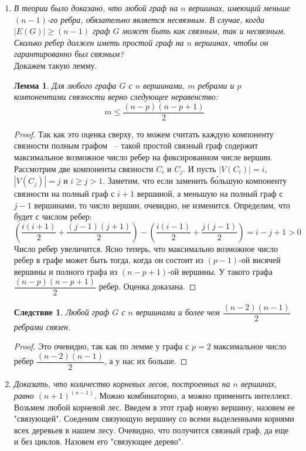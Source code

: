 \documentclass[10pt,a4paper]{article}
\begin{document}
\begin{enumerate}
	\item \textit{В теории было доказано, что любой граф на $n$ вершинах, имеющий меньше $(n-1)$-го ребра, обязательно является несвязным. В случае, когда $|E(G)|\geqslant(n-1)$ граф $G$ может быть как связным, так и несвязным. Сколько ребер должен иметь простой граф на $n$ вершинах, чтобы он гарантированно был связным?}\\
	Докажем такую лемму.
	\newtheorem*{lemma1}{Лемма}
	\begin{lemma1}
	Для любого графа $G$ с $n$ вершинами, $m$ ребрами и $p$ компонентами связности верно следующее неравенство:
	\[
	m \leqslant \dfrac{(n-p)(n-p+1)}{2}
	\]
	\end{lemma1}
	\begin{proof}
	Так как это оценка сверху, то можем считать каждую компоненту связности полным графом ~-- такой простой связный граф содержит максимальное возможное число ребер на фиксированном числе вершин.\\
	Рассмотрим две компоненты связности $C_i$ и $C_j$. И пусть $|V(C_i)|=i$, $|V(C_j)|=j$ и $i \geqslant j > 1$. Заметим, что если заменить б\'{о}льшую компоненту связности на полный граф с $i+1$ вершиной, а меньшую на полный граф с $j-1$ вершинами, то число вершин, очевидно, не изменится. Определим, что будет с числом ребер:
	\[
	\left(\dfrac{i(i+1)}{2}+\dfrac{(j-1)(j+1)}{2}\right)-\left(\frac{i(i-1)}{2}+\frac{j(j-1)}{2}\right) = i-j+1 > 0
	\]
	Число ребер увеличится. Ясно теперь, что максимально возможное число ребер в графе может быть тогда, когда он состоит из $(p-1)$-ой висячей вершины и полного графа из $(n-p+1)$-ой вершины. У такого графа $\dfrac{(n-p)(n-p+1)}{2}$ ребер. Оценка доказана.\qedhere
	\end{proof}
	\newtheorem*{sl_lemma1}{Следствие}
	\begin{sl_lemma1}
	Любой граф $G$ с $n$ вершинами и более чем $\dfrac{(n-2)(n-1)}{2}$ ребрами связен.
	\end{sl_lemma1}
	\begin{proof}
	Это очевидно, так как по лемме у графа с $p=2$ максимальное число ребер $\dfrac{(n-2)(n-1)}{2}$, а у нас их больше.\qedhere
	\end{proof}	
	\item \textit{Доказать, что количество корневых лесов, построенных на $n$ вершинах, равно $(n+1)^{(n-1)}$.}
	Можно комбинаторно, а можно применить интеллект.\\
	Возьмем любой корневой лес.	Введем в этот граф новую вершину, назовем ее "связующей". Соеденим связующую вершину со всеми выделенными корнями всех деревьев в нашем лесу. Очевидно, что получится связный граф, да еще и без циклов. Назовем его "связующее дерево".\\

\end{enumerate}
\end{document}
